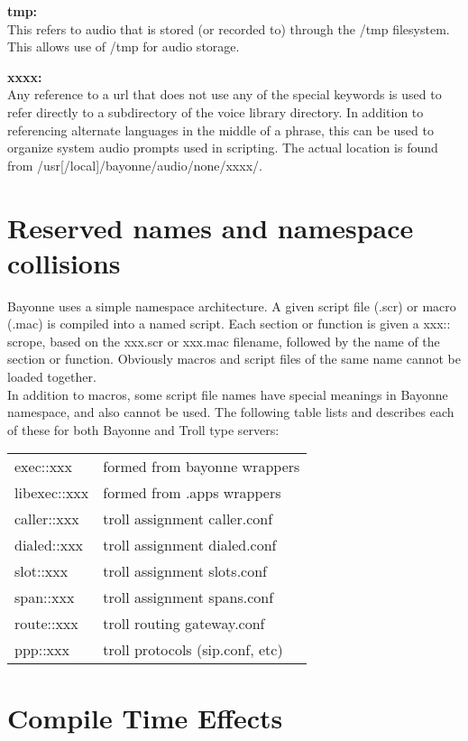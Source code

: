 \documentclass[a4paper,12pt]{article}
\begin{document}
{\bf tmp:} \\
This refers to audio that is stored (or recorded to) through the /tmp 
filesystem.  This allows use of /tmp for audio storage.

{\bf xxxx:} \\
Any reference to a url that does not use any of the special keywords is
used to refer directly to a subdirectory of the voice library directory.
In addition to referencing alternate languages in the middle of a
phrase, this can be used to organize system audio prompts used in
scripting.  The actual location is found from  /usr[/local]/bayonne/audio/none/xxxx/.

\section{Reserved names and namespace collisions}

Bayonne uses a simple namespace architecture.  A given script file (.scr)
or macro (.mac) is compiled into a named script.  Each section or function
is given a xxx:: scrope, based on the xxx.scr or xxx.mac filename, followed by 
the name of the section or function.  Obviously macros and script files of
the same name cannot be loaded together.  \\

In addition to macros, some script file names have special meanings in
Bayonne namespace, and also cannot be used.  The following table lists
and describes each of these for both Bayonne and Troll type servers: \\

\begin{supertabular}{ll}
exec::xxx & formed from bayonne wrappers \\
libexec::xxx & formed from .apps wrappers \\
caller::xxx & troll assignment caller.conf \\
dialed::xxx & troll assignment dialed.conf \\
slot::xxx & troll assignment slots.conf \\
span::xxx & troll assignment spans.conf \\
route::xxx & troll routing gateway.conf \\
ppp::xxx & troll protocols (sip.conf, etc) \\
\end{supertabular}

\section{Compile Time Effects}
\end{document}
